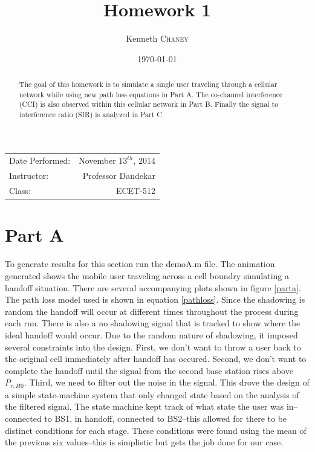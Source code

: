 \documentclass{article}
\title{Homework 1} %
\author{Kenneth \textsc{Chaney}} %
\date{\today} %
\begin{document}
\maketitle %

\begin{center}
\begin{tabular}{l r}
Date Performed: & November \(13^{th}\), 2014 \\ %
Instructor: & Professor Dandekar \\ %
Class: & ECET-512
\end{tabular}
\end{center}

\begin{abstract}
The goal of this homework is to simulate a single user traveling through a cellular network while using new path loss equations in Part A. The co-channel interference (CCI) is also observed within this cellular network in Part B. Finally the signal to interference ratio (SIR) is analyzed in Part C.

\end{abstract}

\pagebreak

\section{Part A}\label{partA}

To generate results for this section run the demoA.m file. The animation generated shows the mobile user traveling across a cell boundry simulating a handoff situation. There are several accompanying plots shown in figure \ref{parta}.\\

The path loss model used is shown in equation \ref{pathloss}. Since the shadowing is random the handoff will occur at different times throughout the process during each run. There is also a no shadowing signal that is tracked to show where the ideal handoff would occur. Due to the random nature of shadowing, it imposed several constraints into the design. First, we don't want to throw a user back to the original cell immediately after handoff has occured. Second, we don't want to complete the handoff until the signal from the second base station rises above \( P_{r,H0} \). Third, we need to filter out the noise in the signal. This drove the design of a simple state-machine system that only changed state based on the analysis of the filtered signal. The state machine kept track of what state the user was in--connected to BS1, in handoff, connected to BS2--this allowed for there to be distinct conditions for each stage. These conditions were found using the mean of the previous six values--this is simplistic but gets the job done for our case. \\
\end{document}
